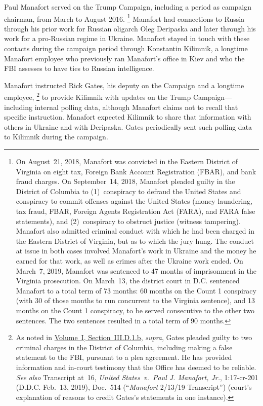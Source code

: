 Paul Manafort served on the Trump Campaign, including a period as campaign chairman, from March to August 2016.%
\footnote{On August~21, 2018, Manafort was convicted in the Eastern District of Virginia on eight tax, Foreign Bank Account Registration (FBAR), and bank fraud charges. On September~14, 2018, Manafort pleaded guilty in the District of Columbia to (1)~conspiracy to defraud the United States and conspiracy to commit offenses against the United States (money laundering, tax fraud, FBAR, Foreign Agents Registration Act (FARA), and FARA false statements), and (2)~conspiracy to obstruct justice (witness tampering).
Manafort also admitted criminal conduct with which he had been charged in the Eastern District of Virginia, but as to which the jury hung.
The conduct at issue in both cases involved Manafort's work in Ukraine and the money he earned for that work, as well as crimes after the Ukraine work ended. On March~7, 2019, Manafort was sentenced to 47 months of imprisonment in the Virginia prosecution.
On March~13, the district court in D.C. sentenced Manafort to a total term of 73 months: 60 months on the Count 1 conspiracy (with 30 of those months to run concurrent to the Virginia sentence), and 13 months on the Count 1 conspiracy, to be served consecutive to the other two sentences.
The two sentences resulted in a total term of 90 months.
}
Manafort had connections to Russia through his prior work for Russian oligarch Oleg Deripaska and later through his work for a pro-Russian regime in Ukraine.
Manafort stayed in touch with these contacts during the campaign period through Konstantin Kilimnik, a longtime Manafort employee who previously ran Manafort's office in Kiev and who the FBI assesses to have ties to Russian intelligence.

Manafort instructed Rick Gates, his deputy on the Campaign and a longtime employee,%
\footnote{As noted in \hyperlink{paragraph.1.3.4.1.2}{Volume~I, Section~III.D.1.b}, \textit{supra}, Gates pleaded guilty to two criminal charges in the District of Columbia, including making a false statement to the FBI, pursuant to a plea agreement.
He has provided information and in-court testimony that the Office has deemed to be reliable. \textit{See also} Transcript at~16, \textit{United States~v.\ Paul J. Manafort, Jr.}, 1:17-cr-201 (D.D.C. Feb.~13, 2019), Doc.~514 (``\textit{Manafort} 2/13/19 Transcript'') (court's explanation of reasons to credit Gates's statements in one instance).}
to provide Kilimnik with updates on the Trump Campaign---including internal polling data, although Manafort claims not to recall that specific instruction.
Manafort expected Kilimnik to share that information with others in Ukraine and with Deripaska.
Gates periodically sent such polling data to Kilimnik during the campaign.

